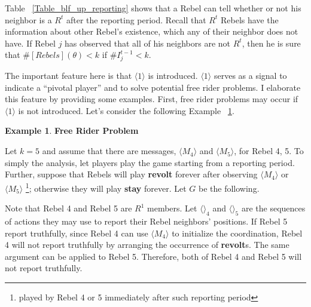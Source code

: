 \documentclass[12pt,letterpaper]{article}
\newtheorem*{main result}{Main Result}
\theoremstyle{definition}
\newtheorem{example}{Example}[section]
\theoremstyle{remark}
\theoremstyle{claim}
\begin{document}
Table ~\ref{Table_blf_up_reporting} shows that a Rebel can tell whether or not his neighbor is a $R^t$ after the reporting period. Recall that $R^t$ Rebels have the information about other Rebel's existence, which any of their neighbor does not have. If Rebel $j$ has observed that all of his neighbors are not $R^t$, then he is sure that $\#[Rebels](\theta)< k$ if $\#I^{t-1}_j<k$. 

The important feature here is that $\langle 1 \rangle$ is introduced. $\langle 1 \rangle$ serves as a signal to indicate a ``pivotal player'' and to solve potential free rider problems. I elaborate this feature by providing some examples. First, free rider problems may occur if $\langle 1 \rangle$ is not introduced. Let's consider the following Example ~\ref{ex_free_rider_tree}.

\begin{example} \label{ex_free_rider_tree}\textbf{Free Rider Problem}

Let $k=5$ and assume that there are messages, $\langle M_4 \rangle$ and $\langle M_5 \rangle$, for Rebel 4, 5. To simply the analysis, let players play the game starting from a reporting period. Further, suppose that Rebels will play \textbf{revolt} forever after observing $\langle M_4 \rangle$ or $\langle M_5 \rangle$ \footnote{played by Rebel 4 or 5 immediately after such reporting period}; otherwise they will play \textbf{stay} forever. Let $G$ be the following.

\begin{center}
\end{center}

Note that Rebel 4 and Rebel 5 are $R^1$ members. Let $\langle \rangle_4$ and $\langle \rangle_5$ are the sequences of actions they may use to report their Rebel neighbors' positions. If Rebel 5 report truthfully, since Rebel 4 can use $\langle M_4 \rangle$ to initialize the coordination, Rebel 4 will not report truthfully by arranging the occurrence of \textbf{revolt}s. The same argument can be applied to Rebel 5. Therefore, both of Rebel 4 and Rebel 5 will not report truthfully.

\end{example}
\end{document}
